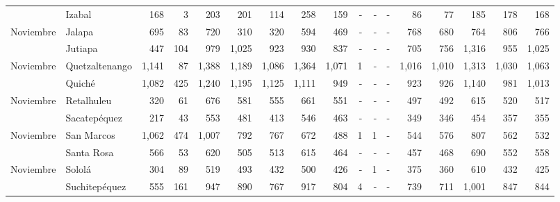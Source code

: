 \begin{landscape}
\begin{center}
\begin{longtable}{llrrrrrrrrrrrrrrr}
\rowcolor{color1!5!white}\multicolumn{1}{l}{	\footnotesize	 Noviembre 	}&	 Izabal 	&	 168 	&	 3 	&	 203 	&	 201 	&	 114 	&	 258 	&	 159 	&	 -   	&	 -   	&	 -   	&	 86 	&	 77 	&	 185 	&	 178 	&	 168 	\\
\multicolumn{1}{l}{	\footnotesize	 Noviembre 	}&	 Jalapa 	&	 695 	&	 83 	&	 720 	&	 310 	&	 320 	&	 594 	&	 469 	&	 -   	&	 -   	&	 -   	&	 768 	&	 680 	&	 764 	&	 806 	&	 766 	\\
\rowcolor{color1!5!white}\multicolumn{1}{l}{	\footnotesize	 Noviembre 	}&	 Jutiapa 	&	 447 	&	 104 	&	 979 	&	 1,025 	&	 923 	&	 930 	&	 837 	&	 -   	&	 -   	&	 -   	&	 705 	&	 756 	&	 1,316 	&	 955 	&	 1,025 	\\
\multicolumn{1}{l}{	\footnotesize	 Noviembre 	}&	 Quetzaltenango 	&	 1,141 	&	 87 	&	 1,388 	&	 1,189 	&	 1,086 	&	 1,364 	&	 1,071 	&	 1 	&	 -   	&	 -   	&	 1,016 	&	 1,010 	&	 1,313 	&	 1,030 	&	 1,063 	\\
\rowcolor{color1!5!white}\multicolumn{1}{l}{	\footnotesize	 Noviembre 	}&	 Quiché 	&	 1,082 	&	 425 	&	 1,240 	&	 1,195 	&	 1,125 	&	 1,111 	&	 949 	&	 -   	&	 -   	&	 -   	&	 923 	&	 926 	&	 1,140 	&	 981 	&	 1,013 	\\
\multicolumn{1}{l}{	\footnotesize	 Noviembre 	}&	 Retalhuleu 	&	 320 	&	 61 	&	 676 	&	 581 	&	 555 	&	 661 	&	 551 	&	 -   	&	 -   	&	 -   	&	 497 	&	 492 	&	 615 	&	 520 	&	 517 	\\
\rowcolor{color1!5!white}\multicolumn{1}{l}{	\footnotesize	 Noviembre 	}&	 Sacatepéquez 	&	 217 	&	 43 	&	 553 	&	 481 	&	 413 	&	 546 	&	 463 	&	 -   	&	 -   	&	 -   	&	 349 	&	 346 	&	 454 	&	 357 	&	 355 	\\
\multicolumn{1}{l}{	\footnotesize	 Noviembre 	}&	 San Marcos 	&	 1,062 	&	 474 	&	 1,007 	&	 792 	&	 767 	&	 672 	&	 488 	&	 1 	&	 1 	&	 -   	&	 544 	&	 576 	&	 807 	&	 562 	&	 532 	\\
\rowcolor{color1!5!white}\multicolumn{1}{l}{	\footnotesize	 Noviembre 	}&	 Santa Rosa 	&	 566 	&	 53 	&	 620 	&	 505 	&	 513 	&	 615 	&	 464 	&	 -   	&	 -   	&	 -   	&	 457 	&	 468 	&	 690 	&	 552 	&	 558 	\\
\multicolumn{1}{l}{	\footnotesize	 Noviembre 	}&	 Sololá 	&	 304 	&	 89 	&	 519 	&	 493 	&	 432 	&	 500 	&	 426 	&	 -   	&	 1 	&	 -   	&	 375 	&	 360 	&	 610 	&	 432 	&	 425 	\\
\rowcolor{color1!5!white}\multicolumn{1}{l}{	\footnotesize	 Noviembre 	}&	 Suchitepéquez 	&	 555 	&	 161 	&	 947 	&	 890 	&	 767 	&	 917 	&	 804 	&	 4 	&	 -   	&	 -   	&	 739 	&	 711 	&	 1,001 	&	 847 	&	 844 	\\

\end{longtable}
\end{center}
\end{landscape}
